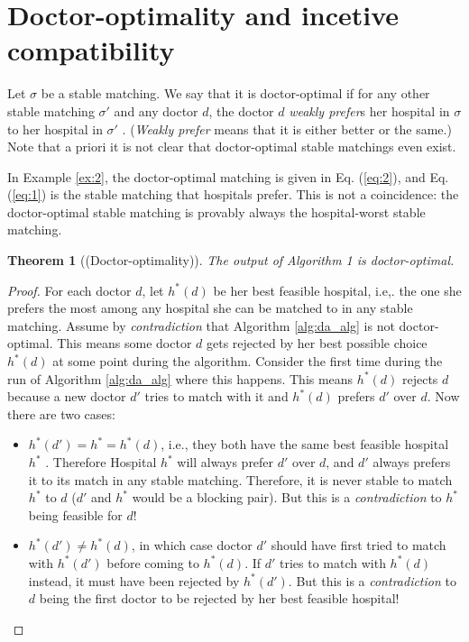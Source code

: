 \documentclass [12pt]{article}
\newtheorem{theorem}{Theorem}
\theoremstyle{definition}
\begin{document}
\section{Doctor-optimality and incetive compatibility}

Let $\sigma$ be a stable matching. We say that it is doctor-optimal if for any other stable matching $\sigma'$ and any doctor $d$, the doctor $d$ \textit{weakly prefer}s her hospital in $\sigma$ to her hospital in $\sigma'$ . (\textit{Weakly prefer} means that it is either better or the same.) Note that a priori it is not clear that doctor-optimal stable matchings even exist. 

In Example \ref{ex:2}, the doctor-optimal matching is given in Eq. (\ref{eq:2}), and Eq. (\ref{eq:1}) is the stable matching that hospitals prefer. This is not a coincidence: the doctor-optimal stable matching is provably always the hospital-worst stable matching. 


\begin{theorem}[(Doctor-optimality)]
The output of Algorithm 1 is doctor-optimal.
\end{theorem} 
\begin{proof}
For each doctor $d$, let $h^*(d)$ be her best feasible hospital, i.e,. the one she prefers the most among any hospital she can be matched to in any stable matching. Assume by \textit{contradiction} that Algorithm \ref{alg:da_alg} is not doctor-optimal. This means some doctor $d$ gets rejected by her best possible choice $h^*(d)$ at some point during the algorithm. Consider the first time during the run of Algorithm \ref{alg:da_alg} where this happens. This means $h^*(d)$ rejects $d$ because a new doctor $d'$ tries to match with it and $h^*(d)$ prefers $d'$ over $d$. Now there are two cases:

\begin{itemize}
    \item $h^*(d') = h^* = h^*(d)$, i.e., they both have the same best feasible hospital $h^*$ . Therefore Hospital $h^*$ will always prefer $d'$ over $d$, and $d'$ always prefers it to its match in any stable matching. Therefore, it is never stable to match $h^*$ to $d$ ($d'$ and $h^*$ would be a blocking pair). But this is a \textit{contradiction} to $h^*$ being feasible for $d$!
    \item $h^*(d') \neq h^*(d)$, in which case doctor $d'$ should have first tried to match with $h^*(d')$ before coming to $h^*(d)$. If $d'$ tries to match with $h^*(d)$ instead, it must have been rejected by $h^*(d')$. But this is a \textit{contradiction} to $d$ being the first doctor to be rejected by her best feasible hospital! 
\end{itemize}
\end{proof}
\end{document}
